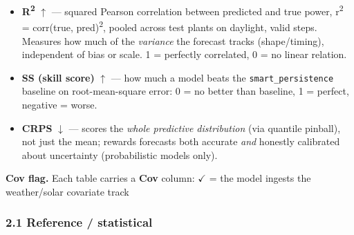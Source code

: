 \documentclass[
  9pt,
]{article}
\providecommand{\tightlist}{%
  \setlength{\itemsep}{0pt}\setlength{\parskip}{0pt}}
\begin{document}
\begin{itemize}
\tightlist
\item
  \textbf{R\textsuperscript{2}} \(\uparrow\) --- squared Pearson correlation between predicted and
  true power, r\textsuperscript{2} = corr(true, pred)\textsuperscript{2}, pooled across test plants on
  daylight, valid steps. Measures how much of the \emph{variance} the
  forecast tracks (shape/timing), independent of bias or scale. 1 =
  perfectly correlated, 0 = no linear relation.
\item
  \textbf{SS (skill score)} \(\uparrow\) --- how much a model beats the
  \texttt{smart\_\allowbreak{}persistence} baseline on root-mean-square error: 0 = no
  better than baseline, 1 = perfect, negative = worse.
\item
  \textbf{CRPS} \(\downarrow\) --- scores the \emph{whole predictive distribution}
  (via quantile pinball), not just the mean; rewards forecasts both
  accurate \emph{and} honestly calibrated about uncertainty
  (probabilistic models only).
\end{itemize}

\textbf{Cov flag.} Each table carries a \textbf{Cov} column: \(\checkmark\) = the
model ingests the weather/solar covariate track

\subsubsection{2.1 Reference / statistical}\label{reference-statistical}
\end{document}
